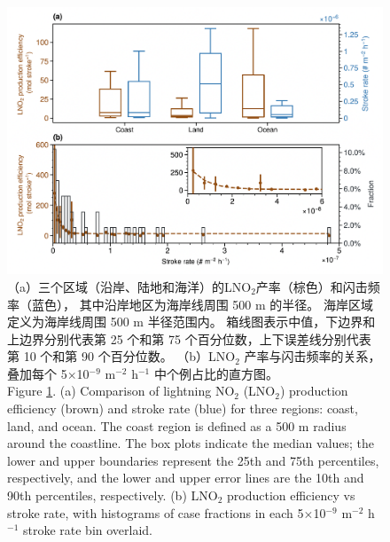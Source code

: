 \begin{figure}[!htbp]
\centering
\includegraphics[width=15cm]{./figures/arctic_pe_rate.png}
\caption{
（a）三个区域（沿岸、陆地和海洋）的LNO$_2$产率（棕色）和闪击频率（蓝色），
其中沿岸地区为海岸线周围 500 m 的半径。
海岸区域定义为海岸线周围 500 m 半径范围内。
箱线图表示中值，下边界和上边界分别代表第 25 个和第 75 个百分位数，上下误差线分别代表第 10 个和第 90 个百分位数。
（b）LNO$_2$ 产率与闪击频率的关系，叠加每个 5$\times$10$^{-9}$ m$^{-2}$ h$^{-1}$ 中个例占比的直方图。 \\
Figure \ref{fig:arctic_pe_rate}. (a) Comparison of lightning NO$_2$ (LNO$_2$) production efficiency (brown) and stroke rate (blue) for three regions: coast, land, and ocean.
The coast region is defined as a 500 m radius around the coastline.
The box plots indicate the median values; the lower and upper boundaries represent the 25th and 75th percentiles, respectively, and the lower and upper error lines are the 10th and 90th percentiles, respectively.
(b) LNO$_2$ production efficiency vs stroke rate, with histograms of case fractions in each 5$\times$10$^{-9}$ m$^{-2}$ h$^{-1}$ stroke rate bin overlaid.
}
\label{fig:arctic_pe_rate}
\end{figure}


